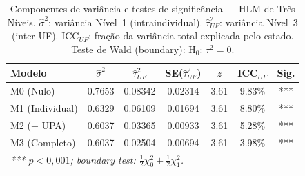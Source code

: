 \begin{table}[H]
\centering
\caption{Componentes de variância e testes de significância — HLM de Três Níveis.
  $\hat{\sigma}^2$: variância Nível~1 (intraindividual).
  $\hat{\tau}^2_{UF}$: variância Nível~3 (inter-UF).
  ICC$_{UF}$: fração da variância total explicada pelo estado.
  Teste de Wald (boundary): H$_0$: $\tau^2 = 0$.}
\label{tab:variancia_componentes}
\begin{tabular}{lcccccc}
\toprule
\textbf{Modelo} & $\hat{\sigma}^2$ & $\hat{\tau}^2_{UF}$ & SE($\hat{\tau}^2_{UF}$) & $z$ & ICC$_{UF}$ & Sig. \\
\midrule
M0 (Nulo)         & 0.7653 & 0.08342 & 0.02314 & 3.61 & 9.83\% & *** \\
M1 (Individual)   & 0.6329 & 0.06109 & 0.01694 & 3.61 & 8.80\% & *** \\
M2 (+ UPA)        & 0.6037 & 0.03365 & 0.00933 & 3.61 & 5.28\% & *** \\
M3 (Completo)     & 0.6037 & 0.02504 & 0.00694 & 3.61 & 3.98\% & *** \\
\bottomrule
\multicolumn{7}{l}{\textit{*** $p < 0{,}001$; boundary test: $\frac{1}{2}\chi^2_0 + \frac{1}{2}\chi^2_1$.}}\\
\end{tabular}
\end{table}
